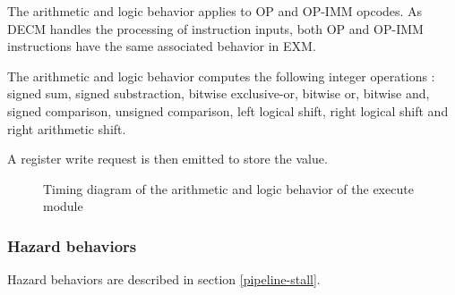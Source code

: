       \begin{content}
          The arithmetic and logic behavior applies to OP and OP-IMM opcodes. As DECM handles the processing of instruction inputs, both OP and OP-IMM instructions have the same associated behavior in EXM.

          The arithmetic and logic behavior computes the following integer operations : signed sum, signed substraction, bitwise exclusive-or, bitwise or, bitwise and, signed comparison, unsigned comparison, left logical shift, right logical shift and right arithmetic shift.
          
          A register write request is then emitted to store the value.
        \end{content}

      \begin{figure}[H]
          \centering
          
          \caption{Timing diagram of the arithmetic and logic behavior of the execute module}
          \label{fig:exm-behavior-arithmetic-logic}
        \end{figure}

      

    \subsubsection{Hazard behaviors}

      \begin{content}
          Hazard behaviors are described in section \ref{pipeline-stall}.
        \end{content}

\newpage
